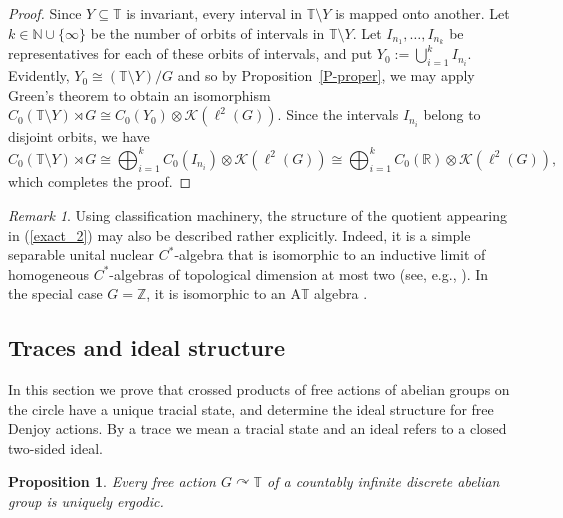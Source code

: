 \documentclass[11pt,a4paper,leqno]{amsart}
\newtheorem{prop}[thm]{Proposition}
\theoremstyle{definition}
\theoremstyle{remark}
\newtheorem{rem}[thm]{Remark}
\numberwithin{equation}{section}
\theoremstyle{plain}
\newcommand{\Nb}{\mathbb{N}}
\newcommand{\Tb}{\mathbb{T}}
\newcommand{\Rb}{\mathbb{R}}
\newcommand{\Kc}{\mathcal{K}}
\begin{document}
\begin{proof}
    Since $Y\subseteq \Tb$ is invariant, every interval in $\Tb\setminus Y$ is mapped onto another. Let $k \in \Nb\cup \{\infty\}$ be the number of orbits of intervals in $\Tb\setminus Y$. Let $I_{n_1},\ldots,I_{n_k}$ be representatives for each of these orbits of intervals, and put $Y_0 := \bigcup_{i = 1}^k I_{n_i}$. Evidently, $Y_0 \cong (\Tb\setminus Y)/G$ and so by Proposition~\ref{P-proper}, we may apply Green's theorem \cite[Corollary 15]{Gre77} to obtain an isomorphism $C_0(\Tb\setminus Y) \rtimes G \cong C_0(Y_0)\otimes \Kc(\ell^2(G))$. Since the intervals $I_{n_i}$ belong to disjoint orbits, we have 
    \[
        C_0(\Tb\setminus Y) \rtimes G \cong \bigoplus_{i=1}^k C_0(I_{n_i}) \otimes \Kc(\ell^2(G)) \cong \bigoplus_{i=1}^k C_0(\Rb)\otimes \Kc(\ell^2(G)), 
    \]
which completes the proof. 
\end{proof}

\begin{rem}\label{R-quotient}
	Using classification machinery, the structure of the quotient appearing in (\ref{exact_2}) may also be described rather explicitly. Indeed, it is a simple separable unital nuclear $C^*$-algebra that is isomorphic to an inductive limit of homogeneous $C^*$-algebras of topological dimension at most two (see, e.g., \cite[Theorem 8.2]{KerSza20}). In the special case $G = \mathbb{Z}$, it is isomorphic to an A$\Tb$ algebra \cite{Put89}.  
\end{rem}

\subsection{Traces and ideal structure}\label{sec:trace_ideal}

In this section we prove that crossed products of free actions of abelian groups on the circle have a unique tracial state, and determine the ideal structure for free Denjoy actions. By a trace we mean a tracial state and an ideal refers to a closed two-sided ideal. 

\begin{prop}\label{P-unique erg}
    Every free action $G\curvearrowright \Tb$ of a countably infinite discrete abelian group is uniquely ergodic. 
\end{prop}
\end{document}

